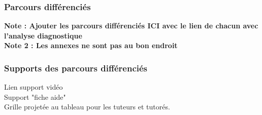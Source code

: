 \subsubsection*{Parcours différenciés}
\textbf{\color{red} Note : Ajouter les parcours différenciés ICI avec le lien de chacun avec l'analyse diagnostique\\
Note 2 : Les annexes ne sont pas au bon endroit}
\subsubsection*{Supports des parcours différenciés}
Lien support vidéo\\
Support "fiche aide"\\
Grille projetée au tableau pour les tuteurs et tutorés.